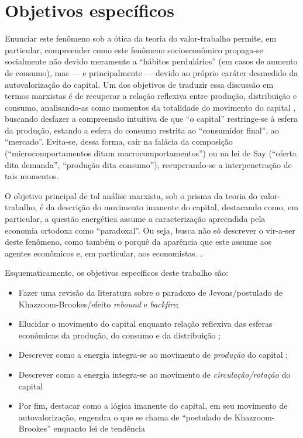 \section{Objetivos específicos}
Enunciar este fenômeno sob a ótica da teoria do valor-trabalho permite, em particular, compreender como este fenômeno socioeconômico propaga-se socialmente não devido meramente a ``hábitos perdulários'' (em casos de aumento de consumo), mas --- e principalmente --- devido ao próprio caráter desmedido da autovalorização do capital. Um dos objetivos de traduzir essa discussão em termos marxistas é de recuperar a relação reflexiva entre produção, distribuição e consumo, analisando-as como momentos da totalidade do movimento do capital \parencite{Marx2011}, buscando desfazer a compreensão intuitiva de que ``o capital'' restringe-se à esfera da produção, estando a esfera do consumo restrita ao ``consumidor final'', ao ``mercado''. Evita-se, dessa forma, cair na falácia da composição (``microcomportamentos ditam macrocomportamentos'') ou na lei de Say (``oferta dita demanda'', ``produção dita consumo''), recuperando-se a interpenetração de tais momentos.

O objetivo principal de tal análise marxista, sob o prisma da teoria do valor-trabalho, é da descrição do movimento imanente do capital, destacando como, em particular, a questão energética assume a caracterização apreendida pela economia ortodoxa como ``paradoxal''. Ou seja, busca não só descrever o vir-a-ser deste fenômeno, como também o porquê da aparência que este assume aos agentes econômicos e, em particular, aos economistas. \parencite{Marx2017,Marx2014,Marx2017a}. 

Esquematicamente, os objetivos específicos deste trabalho são:
\begin{itemize}
    \item Fazer uma revisão da literatura sobre o paradoxo de Jevons/postulado de Khazzoom-Brookes/efeito \textit{rebound} e \textit{backfire};
    \item Elucidar o movimento do capital enquanto relação reflexiva das esferas econômicas da produção, do consumo e da distribuição \parencite{Marx2011};
    \item Descrever como a energia integra-se ao movimento de \textit{produção} do capital \parencite{Marx2017,SaBarreto2018,SaBarreto2022};
    \item Descrever como a energia integra-se ao movimento de \textit{circulação/rotação} do capital \parencite{Marx2014,SaBarreto2018,SaBarreto2022}
    \item Por fim, destacar como a lógica imanente do capital, em seu movimento de autovalorização, engendra o que se chama de ``postulado de Khazzoom-Brookes'' enquanto lei de tendência \parencite{Medeiros2013,Lawson1997,Bhaskar1978,Bhaskar1998}
\end{itemize}


